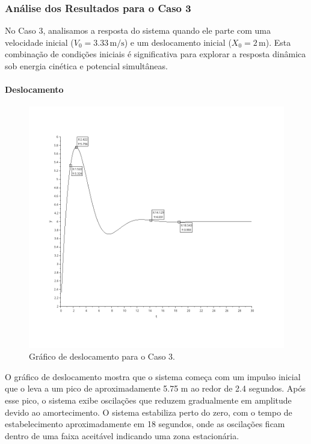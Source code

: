 \subsubsection{Análise dos Resultados para o Caso 3}
No Caso 3, analisamos a resposta do sistema quando ele parte com uma velocidade inicial (\(V_0 = 3.33 \, \text{m/s}\)) e um deslocamento inicial (\(X_0 = 2 \, \text{m}\)). Esta combinação de condições iniciais é significativa para explorar a resposta dinâmica sob energia cinética e potencial simultâneas.

\paragraph{Deslocamento}
\begin{figure}[H]
    \centering
    \includegraphics[height=0.7\textwidth]{final/2-atividade/assets/deslocamento-caso-3.png}
    \caption{Gráfico de deslocamento para o Caso 3.}
\end{figure}
O gráfico de deslocamento mostra que o sistema começa com um impulso inicial que o leva a um pico de aproximadamente 5.75 m ao redor de 2.4 segundos. Após esse pico, o sistema exibe oscilações que reduzem gradualmente em amplitude devido ao amortecimento. O sistema estabiliza perto do zero, com o tempo de estabelecimento aproximadamente em 18 segundos, onde as oscilações ficam dentro de uma faixa aceitável indicando uma zona estacionária.

